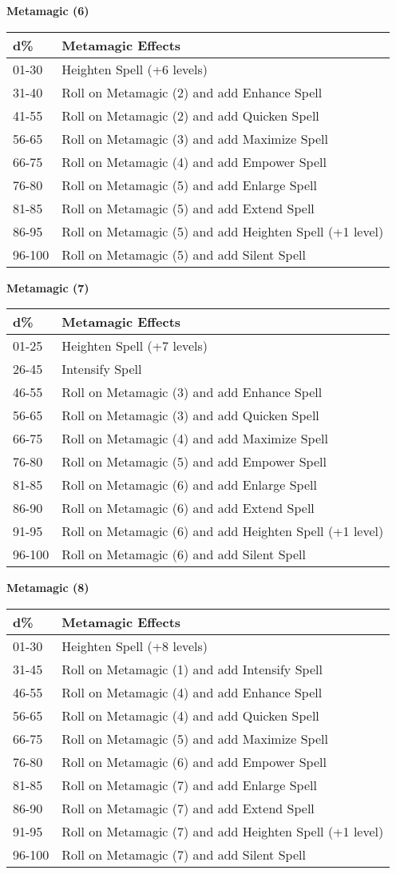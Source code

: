 \documentclass{article}
\begin{document}
\vspace{24pt}
\textbf{Metamagic (6) }

\begin{tabular}{|>{\raggedright}p{38pt}|>{\raggedright}p{235pt}|}
\hline
d\textbf{\%} & M\textbf{etamagic Effects }\tabularnewline
\hline
01-30 & Heighten Spell (+6 levels) \tabularnewline
\hline
31-40 & Roll on Metamagic (2) and add Enhance Spell \tabularnewline
\hline
41-55 & Roll on Metamagic (2) and add Quicken Spell \tabularnewline
\hline
56-65 & Roll on Metamagic (3) and add Maximize Spell \tabularnewline
\hline
66-75 & Roll on Metamagic (4) and add Empower Spell \tabularnewline
\hline
76-80 & Roll on Metamagic (5) and add Enlarge Spell \tabularnewline
\hline
81-85 & Roll on Metamagic (5) and add Extend Spell \tabularnewline
\hline
86-95 & Roll on Metamagic (5) and add Heighten Spell (+1 level) \tabularnewline
\hline
96-100 & Roll on Metamagic (5) and add Silent Spell \tabularnewline
\hline
\end{tabular}

\vspace{12pt}
\textbf{Metamagic (7) }

\begin{tabular}{|>{\raggedright}p{38pt}|>{\raggedright}p{235pt}|}
\hline
d\textbf{\%} & M\textbf{etamagic Effects }\tabularnewline
\hline
01-25 & Heighten Spell (+7 levels) \tabularnewline
\hline
26-45 & Intensify Spell \tabularnewline
\hline
46-55 & Roll on Metamagic (3) and add Enhance Spell \tabularnewline
\hline
56-65 & Roll on Metamagic (3) and add Quicken Spell \tabularnewline
\hline
66-75 & Roll on Metamagic (4) and add Maximize Spell \tabularnewline
\hline
76-80 & Roll on Metamagic (5) and add Empower Spell \tabularnewline
\hline
81-85 & Roll on Metamagic (6) and add Enlarge Spell \tabularnewline
\hline
86-90 & Roll on Metamagic (6) and add Extend Spell \tabularnewline
\hline
91-95 & Roll on Metamagic (6) and add Heighten Spell (+1 level) \tabularnewline
\hline
96-100 & Roll on Metamagic (6) and add Silent Spell\tabularnewline
\hline
\end{tabular} 

\vspace{12pt}
\textbf{Metamagic (8) }

\begin{tabular}{|>{\raggedright}p{38pt}|>{\raggedright}p{235pt}|}
\hline
d\textbf{\%} & M\textbf{etamagic Effects}\tabularnewline
\hline
01-30 & Heighten Spell (+8 levels) \tabularnewline
\hline
31-45 & Roll on Metamagic (1) and add Intensify Spell \tabularnewline
\hline
46-55 & Roll on Metamagic (4) and add Enhance Spell \tabularnewline
\hline
56-65 & Roll on Metamagic (4) and add Quicken Spell \tabularnewline
\hline
66-75 & Roll on Metamagic (5) and add Maximize Spell \tabularnewline
\hline
76-80 & Roll on Metamagic (6) and add Empower Spell \tabularnewline
\hline
81-85 & Roll on Metamagic (7) and add Enlarge Spell \tabularnewline
\hline
86-90 & Roll on Metamagic (7) and add Extend Spell \tabularnewline
\hline
91-95 & Roll on Metamagic (7) and add Heighten Spell (+1 level) \tabularnewline
\hline
96-100 &  Roll on Metamagic (7) and add Silent Spell \tabularnewline
\hline
\end{tabular}
\end{document}
